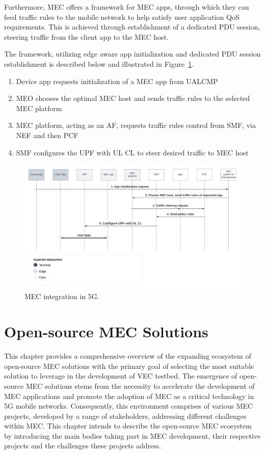 \documentclass[12pt,a4paper,twoside]{report}
\begin{document}
Furthermore, MEC offers a framework for MEC apps, through which they can feed traffic rules to the mobile network to help satisfy user application QoS requirements. This is achieved through establishment of a dedicated PDU session, steering traffic from the client app to the MEC host.

The framework, utilizing edge aware app initialization and dedicated PDU session establishment is described below and illustrated in Figure~\ref{F:MEC-5G-integration}.
\begin{enumerate}
	\item Device app requests initialization of a MEC app from UALCMP
	\item MEO chooses the optimal MEC host and sends traffic rules to the selected MEC platform
	\item MEC platform, acting as an AF, requests traffic rules control from SMF, via NEF and then PCF 
	\item SMF configures the UPF with UL CL to steer desired traffic to MEC host
\end{enumerate}

\begin{figure}[ht]
	\centering
	\includegraphics[width=\textwidth]{./images/MEC-5G-integration-flowchart.png}
	\caption{MEC integration in 5G.}
	\label{F:MEC-5G-integration}
\end{figure}

\chapter{Open-source MEC Solutions}
\label{Ch:o-sMEC}
This chapter provides a comprehensive overview of the expanding ecosystem of open-source MEC solutions with the primary goal of selecting the most suitable solution to leverage in the development of VEC testbed. The emergence of open-source MEC solutions stems from the necessity to accelerate the development of MEC applications and promote the adoption of MEC as a critical technology in 5G mobile networks. Consequently, this environment comprises of various MEC projects, developed by a range of stakeholders, addressing different challenges within MEC. This chapter intends to describe the open-source MEC ecosystem by introducing the main bodies taking part in MEC development, their respective projects and the challenges these projects address.
\end{document}
